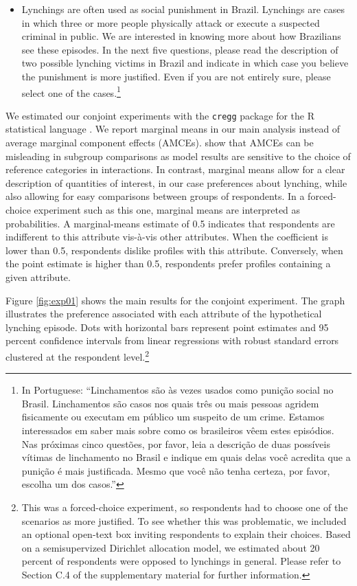 \documentclass[12pt,ansiapaper]{article}
\providecommand{\tightlist}{%
   \setlength{\itemsep}{0pt}\setlength{\parskip}{0pt}}
\begin{document}
\begin{itemize}
\tightlist
\item
  Lynchings are often used as social punishment in Brazil. Lynchings are cases in which three or more people physically attack or execute a suspected criminal in public. We are interested in knowing more about how Brazilians see these episodes. In the next five questions, please read the description of two possible lynching victims in Brazil and indicate in which case you believe the punishment is more justified. Even if you are not entirely sure, please select one of the cases.\footnote{In Portuguese: ``Linchamentos são às vezes usados como punição social no Brasil. Linchamentos são casos nos quais três ou mais pessoas agridem fisicamente ou executam em público um suspeito de um crime. Estamos interessados em saber mais sobre como os brasileiros vêem estes episódios. Nas próximas cinco questões, por favor, leia a descrição de duas possíveis vítimas de linchamento no Brasil e indique em quais delas você acredita que a punição é mais justificada. Mesmo que você não tenha certeza, por favor, escolha um dos casos.''}
\end{itemize}

We estimated our conjoint experiments with the \texttt{cregg} package \citep{leeper2018cregg} for the R statistical language \citep{rstats2019}. We report marginal means in our main analysis instead of average marginal component effects (AMCEs). \citet{leeper2018subgroup} show that AMCEs can be misleading in subgroup comparisons as model results are sensitive to the choice of reference categories in interactions. In contrast, marginal means allow for a clear description of quantities of interest, in our case preferences about lynching, while also allowing for easy comparisons between groups of respondents. In a forced-choice experiment such as this one, marginal means are interpreted as probabilities. A marginal-means estimate of 0.5 indicates that respondents are indifferent to this attribute vis-à-vis other attributes. When the coefficient is lower than 0.5, respondents dislike profiles with this attribute. Conversely, when the point estimate is higher than 0.5, respondents prefer profiles containing a given attribute.

Figure \ref{fig:exp01} shows the main results for the conjoint experiment. The graph illustrates the preference associated with each attribute of the hypothetical lynching episode. Dots with horizontal bars represent point estimates and 95 percent confidence intervals from linear regressions with robust standard errors clustered at the respondent level.\footnote{This was a forced-choice experiment, so respondents had to choose one of the scenarios as more justified. To see whether this was problematic, we included an optional open-text box inviting respondents to explain their choices. Based on a semisupervized Dirichlet allocation model, we estimated about 20 percent of respondents were opposed to lynchings in general. Please refer to Section C.4 of the supplementary material for further information.}
\end{document}
